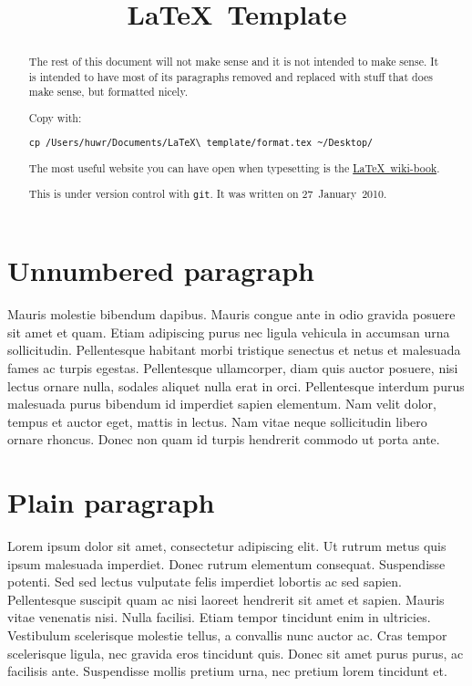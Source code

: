 \documentclass[11pt]{article}
\title{\LaTeX\ Template}%
\author{\href{mailto:huw.rowlands@ieee.org}{\myname}}
\date{\oldtoday} %
\begin{document}
\maketitle
\tableofcontents


\begin {abstract}
The rest of this document will not make sense and it is not intended to make sense. It is intended to have most of its paragraphs removed and replaced with stuff that does make sense, but formatted nicely.

Copy with:

\begin{verbatim}
cp /Users/huwr/Documents/LaTeX\ template/format.tex ~/Desktop/
\end{verbatim}

The most useful website you can have open when typesetting is the \href{http://en.wikibooks.org/wiki/LaTeX}{\LaTeX\ wiki-book}.


This is under version control with \texttt{git}. It was written on 27\ January\ 2010.
\end {abstract}

\section*{Unnumbered paragraph}
Mauris molestie bibendum dapibus. Mauris congue ante in odio gravida posuere sit amet et quam. Etiam adipiscing purus nec ligula vehicula in accumsan urna sollicitudin. Pellentesque habitant morbi tristique senectus et netus et malesuada fames ac turpis egestas. Pellentesque ullamcorper, diam quis auctor posuere, nisi lectus ornare nulla, sodales aliquet nulla erat in orci. Pellentesque interdum purus malesuada purus bibendum id imperdiet sapien elementum. Nam velit dolor, tempus et auctor eget, mattis in lectus. Nam vitae neque sollicitudin libero ornare rhoncus. Donec non quam id turpis hendrerit commodo ut porta ante.


\section{Plain paragraph}
Lorem ipsum dolor sit amet, consectetur adipiscing elit. Ut rutrum metus quis ipsum malesuada imperdiet. Donec rutrum elementum consequat. Suspendisse potenti. Sed sed lectus vulputate felis imperdiet lobortis ac sed sapien. Pellentesque suscipit quam ac nisi laoreet hendrerit sit amet et sapien. Mauris vitae venenatis nisi. Nulla facilisi. Etiam tempor tincidunt enim in ultricies. Vestibulum scelerisque molestie tellus, a convallis nunc auctor ac. Cras tempor scelerisque ligula, nec gravida eros tincidunt quis. Donec sit amet purus purus, ac facilisis ante. Suspendisse mollis pretium urna, nec pretium lorem tincidunt et.
\end{document}
